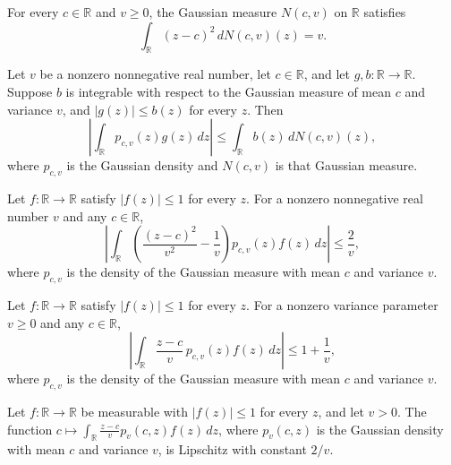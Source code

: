 \begin{lemma}
\leanok
{}
For every $c\in\mathbb R$ and $v\ge0$, the Gaussian measure $N(c,v)$ on $\mathbb R$
satisfies
\[
\int_{\mathbb R}(z-c)^2\,dN(c,v)(z)=v.
\]
\end{lemma}

\begin{lemma}
\leanok
{}
Let $v$ be a nonzero nonnegative real number, let $c\in\mathbb R$, and let $g,b:\mathbb
R\to\mathbb R$. Suppose $b$ is integrable with respect to the Gaussian measure of mean
$c$ and variance $v$, and $|g(z)|\le b(z)$ for every $z$. Then \[\left|\int_{\mathbb
R}p_{c,v}(z)g(z)\,dz\right|\le\int_{\mathbb R}b(z)\,dN(c,v)(z),\] where $p_{c,v}$ is the
Gaussian density and $N(c,v)$ is that Gaussian measure.
\end{lemma}

\begin{lemma}
\leanok
{}
Let $f:\mathbb R\to\mathbb R$ satisfy $|f(z)|\le1$ for every $z$. For a nonzero
nonnegative real number $v$ and any $c\in\mathbb R$, \[\left|\int_{\mathbb
R}\left(\frac{(z-c)^2}{v^2}-\frac1v\right)p_{c,v}(z)f(z)\,dz\right|\le\frac2v,\] where
$p_{c,v}$ is the density of the Gaussian measure with mean $c$ and variance $v$.
\end{lemma}

\begin{lemma}
\leanok
{}
Let $f:\mathbb R\to\mathbb R$ satisfy $|f(z)|\le1$ for every $z$. For a nonzero variance
parameter $v\ge0$ and any $c\in\mathbb R$, \[\left|\int_{\mathbb
R}\frac{z-c}{v}\,p_{c,v}(z)f(z)\,dz\right|\le 1+\frac1v,\] where $p_{c,v}$ is the
density of the Gaussian measure with mean $c$ and variance $v$.
\end{lemma}

\begin{lemma}
\leanok
{}
Let $f:\mathbb R\to\mathbb R$ be measurable with $|f(z)|\le1$ for every $z$, and let
$v>0$. The function $c\mapsto\int_{\mathbb R}\frac{z-c}{v}p_v(c,z)f(z)\,dz$, where
$p_v(c,z)$ is the Gaussian density with mean $c$ and variance $v$, is Lipschitz with
constant $2/v$.
\end{lemma}

